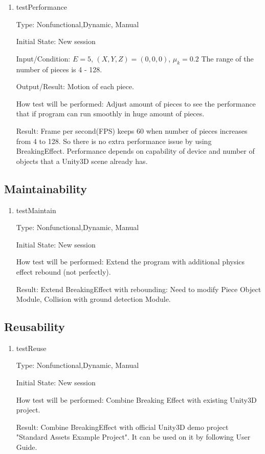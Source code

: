\documentclass[12pt, titlepage]{article}
\begin{document}
\begin{enumerate}
	
	\item{testPerformance\\}
	
	Type: Nonfunctional,Dynamic, Manual
	
	Initial State: New session
	
	Input/Condition: $E = 5$, $(X,Y,Z) = (0,0,0)$, $\mu_{k} = 0.2$ The range of the number of pieces is 4 - 128.
	
	Output/Result: Motion of each piece.
	
	How test will be performed: Adjust amount of pieces to see the performance that if program can run smoothly in huge amount of pieces.
	
	Result: Frame per second(FPS) keeps 60 when number of pieces increases from 4 to 128. So there is no extra performance issue by using BreakingEffect. Performance depends on capability of device and number of objects that a Unity3D scene already has.
\end{enumerate}

\subsection{Maintainability}
	
	\begin{enumerate}
		
		\item{testMaintain}
		
		Type: Nonfunctional,Dynamic, Manual
		
		Initial State: New session
		
		How test will be performed: Extend the program with additional physics effect rebound (not perfectly).
		
		Result: Extend BreakingEffect with rebounding: Need to modify Piece Object Module, Collision with ground detection Module. 
		
	\end{enumerate}
	
\subsection{Reusability}
	
	\begin{enumerate}
		
		\item{testReuse}
		
		Type: Nonfunctional,Dynamic, Manual
		
		Initial State: New session
		
		How test will be performed: Combine Breaking Effect with existing Unity3D project.
		
		Result: Combine BreakingEffect with official Unity3D demo project "Standard Assets Example Project". It can be used on it by following User Guide.
	\end{enumerate}
\end{document}
